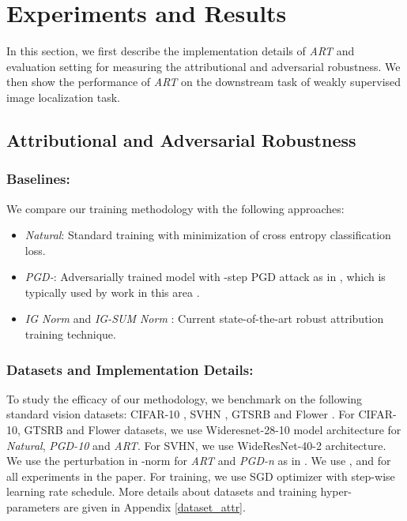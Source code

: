 \documentclass[runningheads]{llncs}
\begin{document}
\begin{table}[t]
{\begin{tabular}{|c|c|>{\centering}p{1.6cm} | >{\centering}p{1.6cm} | >{\centering}p{1.6cm} | c|}
\end{tabular}
}

\end{table}


\section{Experiments and Results}
In this section, we first describe the implementation details of \textit{ART} and evaluation setting for measuring the attributional and adversarial robustness. We then show the performance of \textit{ART} on the downstream task of weakly supervised image localization task. 

\subsection{Attributional and Adversarial Robustness}

\subsubsection{Baselines:} We compare our training methodology with the following approaches:
\begin{itemize}[topsep=0pt]
    \item \textit{Natural}: Standard training with minimization of cross entropy classification loss.
    \item \textit{PGD-}: Adversarially trained model with -step PGD attack as in \cite{madrypgd}, which is typically used by work in this area \cite{robust_attr_nips_sal}. 
    \item{ \textit{IG Norm} and \textit{IG-SUM Norm} \cite{robust_attr_nips_sal}}: Current state-of-the-art robust attribution training technique.
\end{itemize}
\subsubsection{Datasets and Implementation Details:}
To study the efficacy of our methodology, we benchmark on the following standard vision datasets: CIFAR-10 \cite{krizhevsky2010cifar}, SVHN \cite{svhn}, GTSRB \cite{gtsrb} and Flower \cite{flower}. For CIFAR-10, GTSRB and Flower datasets, we use Wideresnet-28-10 \cite{wrn} model architecture for \textit{Natural}, \textit{PGD-10} and \textit{ART}. For SVHN, we use WideResNet-40-2 \cite{wrn} architecture. We use the perturbation  in -norm for \textit{ART} and \textit{PGD-n} as in \cite{madrypgd,robust_attr_nips_sal}. We use ,  and  for all experiments in the paper. For training, we use SGD optimizer with step-wise learning rate schedule. More details about datasets and training hyper-parameters are given in Appendix \ref{dataset_attr}. 
\end{document}
